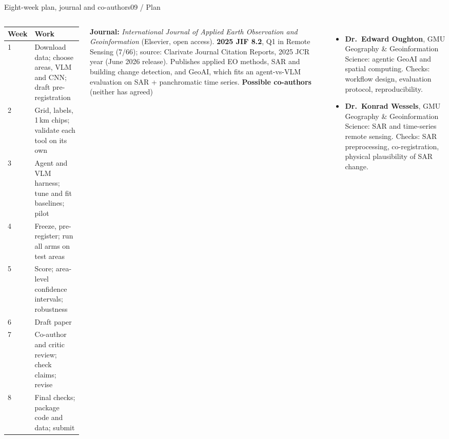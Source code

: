 \documentclass[aspectratio=169,11pt]{beamer}
\begin{document}
\begin{frame}[shrink=10]{Eight-week plan, journal and co-authors}{09 / Plan}
\begin{columns}[T,onlytextwidth]
\scriptsize
\begin{tabular}{@{}lp{5.6cm}@{}}
\toprule
\textbf{Week} & \textbf{Work} \\
\midrule
1 & Download data; choose areas, VLM and CNN; draft pre-registration \\
2 & Grid, labels, 1\,km chips; validate each tool on its own \\
3 & Agent and VLM harness; tune and fit baselines; pilot \\
4 & Freeze, pre-register; run all arms on test areas \\
5 & Score; area-level confidence intervals; robustness \\
6 & Draft paper \\
7 & Co-author and critic review; check claims; revise \\
8 & Final checks; package code and data; submit \\
\bottomrule
\end{tabular}
{\footnotesize\textbf{Journal:} \emph{International Journal of Applied Earth Observation and Geoinformation} (Elsevier, open access). \textbf{2025 JIF 8.2}, Q1 in Remote Sensing (7/66); source: Clarivate Journal Citation Reports, 2025 JCR year (June 2026 release). Publishes applied EO methods, SAR and building change detection, and GeoAI, which fits an agent-vs-VLM evaluation on SAR + panchromatic time series.}
\vspace{6pt}
\textbf{Possible co-authors} {\scriptsize(neither has agreed)}
\begin{itemize}\scriptsize
  \item \textbf{Dr.\ Edward Oughton}, GMU Geography \& Geoinformation Science: agentic GeoAI and spatial computing. Checks: workflow design, evaluation protocol, reproducibility.
  \item \textbf{Dr.\ Konrad Wessels}, GMU Geography \& Geoinformation Science: SAR and time-series remote sensing. Checks: SAR preprocessing, co-registration, physical plausibility of SAR change.
\end{itemize}
\end{columns}
\end{frame}
\end{document}
